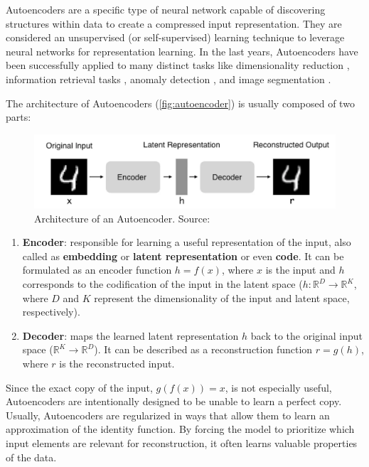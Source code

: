 Autoencoders are a specific type of neural network capable of discovering structures within data to create a compressed input representation. They are considered an unsupervised (or self-supervised) learning technique to leverage neural networks for representation learning. In the last years, Autoencoders have been successfully applied to many distinct tasks like dimensionality reduction \citep{petscharnig2017dimensionality, wang2015dimensionality}, information retrieval tasks \citep{pfeiffer2018neural}, anomaly detection \citep{sakurada2014anomaly}, and image segmentation \citep{baur2018deep, karimpouli2019segmentation}.

The architecture of Autoencoders (\autoref{fig:autoencoder}) is usually composed of two parts:

\begin{figure}[h]
\centering
\includegraphics[width=\linewidth]{images/deep_learning/autoencoder.png}
\caption{Architecture of an Autoencoder. Source: \citep{autoencoder_architecture}}
\label{fig:autoencoder}
\end{figure}

\begin{enumerate}
\item \textbf{Encoder}: responsible for learning a useful representation of the input, also called as \textbf{embedding} or \textbf{latent representation} or even \textbf{code}. It can be formulated as an encoder function $h = f(x)$, where $x$ is the input and $h$ corresponds to the codification of the input in the latent space ($h: \mathbb{R}^D \rightarrow \mathbb{R}^K$, where $D$ and $K$ represent the dimensionality of the input and latent space, respectively).

\item \textbf{Decoder}: maps the learned latent representation $h$ back to the original input space ($\mathbb{R}^K \rightarrow \mathbb{R}^D$). It can be described as a reconstruction function $r = g(h)$, where $r$ is the reconstructed input.
\end{enumerate}

Since the exact copy of the input, $g(f(x)) = x$, is not especially useful, Autoencoders are intentionally designed to be unable to learn a perfect copy. Usually, Autoencoders are regularized in ways that allow them to learn an approximation of the identity function. By forcing the model to prioritize which input elements are relevant for reconstruction,  it often learns valuable properties of the data.

